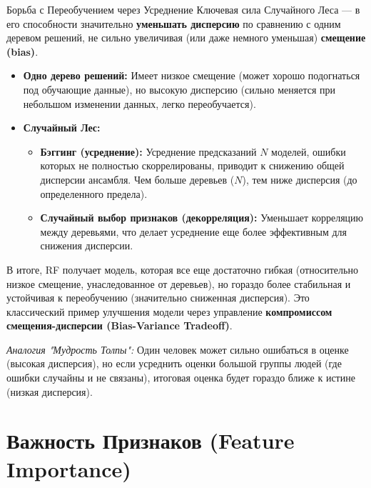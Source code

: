 \begin{myblock}{Борьба с Переобучением через Усреднение}
    Ключевая сила Случайного Леса — в его способности значительно \textbf{уменьшать дисперсию} по сравнению с одним деревом решений, не сильно увеличивая (или даже немного уменьшая) \textbf{смещение (bias)}.
    \begin{itemize}
        \item \textbf{Одно дерево решений:} Имеет низкое смещение (может хорошо подогнаться под обучающие данные), но высокую дисперсию (сильно меняется при небольшом изменении данных, легко переобучается).
        \item \textbf{Случайный Лес:}
            \begin{itemize}
                \item \textbf{Бэггинг (усреднение):} Усреднение предсказаний \(N\) моделей, ошибки которых не полностью скоррелированы, приводит к снижению общей дисперсии ансамбля. Чем больше деревьев (\(N\)), тем ниже дисперсия (до определенного предела).
                \item \textbf{Случайный выбор признаков (декорреляция):} Уменьшает корреляцию между деревьями, что делает усреднение еще более эффективным для снижения дисперсии.
            \end{itemize}
    \end{itemize}
    В итоге, RF получает модель, которая все еще достаточно гибкая (относительно низкое смещение, унаследованное от деревьев), но гораздо более стабильная и устойчивая к переобучению (значительно сниженная дисперсия). Это классический пример улучшения модели через управление \textbf{компромиссом смещения-дисперсии (Bias-Variance Tradeoff)}.
    
    \textit{Аналогия "Мудрость Толпы":} Один человек может сильно ошибаться в оценке (высокая дисперсия), но если усреднить оценки большой группы людей (где ошибки случайны и не связаны), итоговая оценка будет гораздо ближе к истине (низкая дисперсия).
\end{myblock}

\section{Важность Признаков (Feature Importance)}

